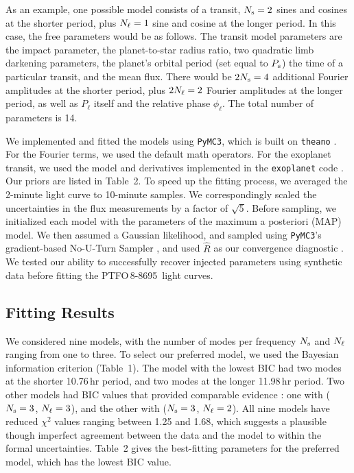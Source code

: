 \documentclass[12pt,twocolumn,tighten]{aastex62}
\newcommand{\ptfo}{PTFO$\,$8-8695}
\begin{document}
As an example, one possible model consists of a transit, $N_{\rm s}=2$
sines and cosines at the shorter period, plus $N_{\rm \ell}=1$ sine
and cosine at the longer period.  In this case, the free parameters
would be as follows.  The transit model parameters are the impact
parameter, the planet-to-star radius ratio, two quadratic limb
darkening parameters, the planet's orbital period (set equal to
$P_{\rm s}$) the time of a particular transit, and the mean flux.
There would be $2N_{\rm s}=4$ additional Fourier amplitudes at the
shorter period, plus $2N_{\rm \ell}=2$ Fourier amplitudes at the
longer period, as well as $P_\ell$ itself and the relative phase
$\phi_\ell$.  The total number of parameters is 14.

We implemented and fitted the models using \texttt{PyMC3}, which is
built on \texttt{theano}
\citep{salvatier_2016_PyMC3,exoplanet:theano}.  For the Fourier terms,
we used the default math operators.  For the exoplanet transit, we
used the model and derivatives implemented in the \texttt{exoplanet}
code \citep{exoplanet:exoplanet}.  Our priors are listed in Table~2.
To speed up the fitting process, we averaged the 2-minute light curve
to 10-minute samples.  We correspondingly scaled the uncertainties in
the flux measurements by a factor of $\sqrt{5}$.  Before sampling, we
initialized each model with the parameters of the maximum a posteriori
(MAP) model.  We then assumed a Gaussian likelihood, and sampled using
\texttt{PyMC3}'s gradient-based No-U-Turn Sampler
\citep{hoffman_no-u-turn_2014}, and used $\hat{R}$ as our convergence
diagnostic \citep{gelman_inference_1992}.  We tested our ability to
successfully recover injected parameters using synthetic data before
fitting the \ptfo\ light curves.


\subsection{Fitting Results}

We considered nine models, with the number of modes per frequency
$N_{\rm s}$ and $N_{\rm \ell}$ ranging from one to three.  To select
our preferred model, we used the Bayesian information criterion
(Table~1).  The model with the lowest BIC had two modes at the shorter
10.76$\,$hr period, and two modes at the longer 11.98$\,$hr period.
Two other models had BIC values that provided comparable evidence
\citep{burnham_multimodel_2016}: one with ($N_{\rm s}=3$, $N_{\rm
\ell}=3$), and the other with ($N_{\rm s}=3$, $N_{\rm \ell}=2$).
All nine models have
reduced $\chi^2$ values ranging between 1.25 and 1.68, which suggests
a plausible though imperfect agreement between the data and the model
to within the formal uncertainties.  Table~2 gives the best-fitting
parameters for the preferred model, which has the lowest BIC value.
\end{document}
